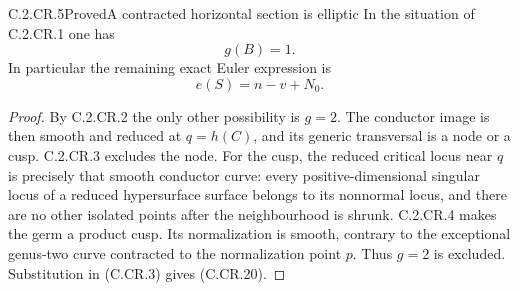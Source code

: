 \begin{statement}{C.2.CR.5}{Proved}{A contracted horizontal section is elliptic}
In the situation of C.2.CR.1 one has
\[
                              g(B)=1.              \tag{C.CR.19}
\]
In particular the remaining exact Euler expression is
\[
                            e(S)=n-v+N_0.          \tag{C.CR.20}
\]
\end{statement}
\begin{proof}
By C.2.CR.2 the only other possibility is $g=2$.
The conductor image is then smooth and reduced at
$q=h(C)$, and its generic transversal is a node or
a cusp. C.2.CR.3 excludes the node. For the cusp,
the reduced critical locus near $q$ is precisely
that smooth conductor curve: every positive-dimensional
singular locus of a reduced hypersurface surface
belongs to its nonnormal locus, and there are no
other isolated points after the neighbourhood is
shrunk. C.2.CR.4 makes the germ a product cusp.
Its normalization is smooth, contrary to the
exceptional genus-two curve contracted to the
normalization point $p$. Thus $g=2$ is excluded.
Substitution in (C.CR.3) gives (C.CR.20).
\end{proof}


